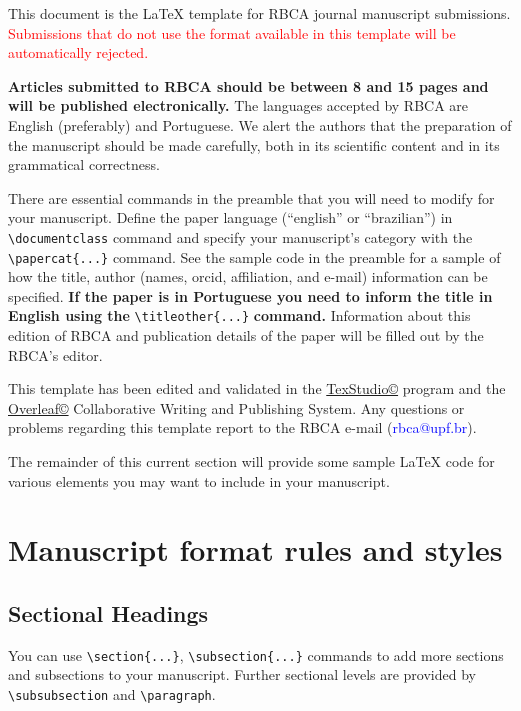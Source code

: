 \documentclass[alpha-refs,english]{RBCA_v3.0}
\begin{document}
This document is the \LaTeX{} template for RBCA journal manuscript submissions. \textcolor{red}{Submissions that do not use the format available in this template will be automatically rejected.} 

\textbf{Articles submitted to RBCA should be between 8 and 15 pages and will be published electronically.} The languages accepted by RBCA are English (preferably) and Portuguese. We alert the authors that the preparation of the manuscript should be made carefully, both in its scientific content and in its grammatical correctness.

There are essential commands in the preamble that you will need to modify for your manuscript. Define the paper language (``english'' or ``brazilian'') in \verb|\documentclass| command and specify your manuscript's category with the \verb|\papercat{...}| command. See the sample code in the preamble for a sample of how the title, author (names, orcid, affiliation, and e-mail) information can be specified. \textbf{If the paper is in Portuguese you need to inform the title in English using the} \verb|\titleother{...}| \textbf{command.} Information about this edition of RBCA and publication details of the paper will be filled out by the RBCA's editor.

This template has been edited and validated in the \href{http://www.texstudio.org/}{TexStudio\copyright} program and the \href{https://www.overleaf.com/}{Overleaf\copyright} Collaborative Writing and Publishing System. Any questions or problems regarding this template report to the RBCA e-mail (\textcolor{blue}{rbca@upf.br}).

The remainder of this current section will provide some sample \LaTeX{} code for various elements you may want to include in your manuscript.

\section{Manuscript format rules and styles}

\subsection{Sectional Headings}
You can use \verb|\section{...}|, \verb|\subsection{...}| commands to add more sections and subsections to your manuscript. Further sectional levels are provided by \verb|\subsubsection| and \verb|\paragraph|.
\end{document}
